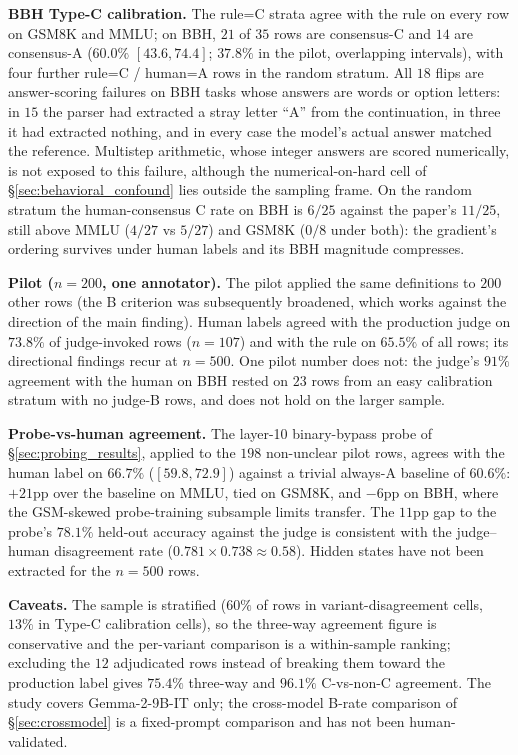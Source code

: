 \documentclass[10pt]{article} %
\begin{document}
\textbf{BBH Type-C calibration.} The rule=C strata agree with the rule on every row on GSM8K and MMLU; on BBH, $21$ of $35$ rows are consensus-C and $14$ are consensus-A ($60.0\%$ $[43.6, 74.4]$; $37.8\%$ in the pilot, overlapping intervals), with four further rule=C / human=A rows in the random stratum. All $18$ flips are answer-scoring failures on BBH tasks whose answers are words or option letters: in $15$ the parser had extracted a stray letter ``A'' from the continuation, in three it had extracted nothing, and in every case the model's actual answer matched the reference. Multistep arithmetic, whose integer answers are scored numerically, is not exposed to this failure, although the numerical-on-hard cell of \S\ref{sec:behavioral_confound} lies outside the sampling frame. On the random stratum the human-consensus C rate on BBH is $6/25$ against the paper's $11/25$, still above MMLU ($4/27$ vs $5/27$) and GSM8K ($0/8$ under both): the gradient's ordering survives under human labels and its BBH magnitude compresses.

\textbf{Pilot ($n = 200$, one annotator).} The pilot applied the same definitions to $200$ other rows (the B criterion was subsequently broadened, which works against the direction of the main finding). Human labels agreed with the production judge on $73.8\%$ of judge-invoked rows ($n = 107$) and with the rule on $65.5\%$ of all rows; its directional findings recur at $n = 500$. One pilot number does not: the judge's $91\%$ agreement with the human on BBH rested on $23$ rows from an easy calibration stratum with no judge-B rows, and does not hold on the larger sample.

\textbf{Probe-vs-human agreement.} The layer-10 binary-bypass probe of \S\ref{sec:probing_results}, applied to the $198$ non-unclear pilot rows, agrees with the human label on $66.7\%$ ($[59.8, 72.9]$) against a trivial always-A baseline of $60.6\%$: $+21$pp over the baseline on MMLU, tied on GSM8K, and $-6$pp on BBH, where the GSM-skewed probe-training subsample limits transfer. The $11$pp gap to the probe's $78.1\%$ held-out accuracy against the judge is consistent with the judge--human disagreement rate ($0.781 \times 0.738 \approx 0.58$). Hidden states have not been extracted for the $n = 500$ rows.

\textbf{Caveats.} The sample is stratified ($60\%$ of rows in variant-disagreement cells, $13\%$ in Type-C calibration cells), so the three-way agreement figure is conservative and the per-variant comparison is a within-sample ranking; excluding the $12$ adjudicated rows instead of breaking them toward the production label gives $75.4\%$ three-way and $96.1\%$ C-vs-non-C agreement. The study covers Gemma-2-9B-IT only; the cross-model B-rate comparison of \S\ref{sec:crossmodel} is a fixed-prompt comparison and has not been human-validated.
\end{document}
